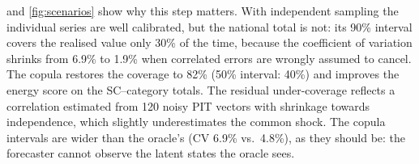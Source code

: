  and \cref{fig:scenarios} show why this step matters.
With independent sampling the individual series are well calibrated, but the national total is not: its 90\% interval covers the realised value only 30\% of the time, because the coefficient of variation shrinks from 6.9\% to 1.9\% when correlated errors are wrongly assumed to cancel.
The copula restores the coverage to 82\% (50\% interval: 40\%) and improves the energy score on the SC--category totals.
The residual under-coverage reflects a correlation estimated from 120 noisy PIT vectors with shrinkage towards independence, which slightly underestimates the common shock.
The copula intervals are wider than the oracle's (CV 6.9\% vs.\ 4.8\%), as they should be: the forecaster cannot observe the latent states the oracle sees.
